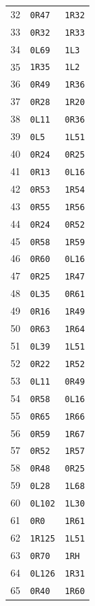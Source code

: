 \begin{center}
\begin{minipage}[t]{0.32\linewidth}
\begin{tabular}{rll}
32&\texttt{0R47}&\texttt{1R32}\\
33&\texttt{0R32}&\texttt{1R33}\\
34&\texttt{0L69}&\texttt{1L3}\\
35&\texttt{1R35}&\texttt{1L2}\\
36&\texttt{0R49}&\texttt{1R36}\\
37&\texttt{0R28}&\texttt{1R20}\\
38&\texttt{0L11}&\texttt{0R36}\\
39&\texttt{0L5}&\texttt{1L51}\\
40&\texttt{0R24}&\texttt{0R25}\\
41&\texttt{0R13}&\texttt{0L16}\\
42&\texttt{0R53}&\texttt{1R54}\\
43&\texttt{0R55}&\texttt{1R56}\\
44&\texttt{0R24}&\texttt{0R52}\\
45&\texttt{0R58}&\texttt{1R59}\\
46&\texttt{0R60}&\texttt{0L16}\\
47&\texttt{0R25}&\texttt{1R47}\\
48&\texttt{0L35}&\texttt{0R61}\\
49&\texttt{0R16}&\texttt{1R49}\\
50&\texttt{0R63}&\texttt{1R64}\\
51&\texttt{0L39}&\texttt{1L51}\\
52&\texttt{0R22}&\texttt{1R52}\\
53&\texttt{0L11}&\texttt{0R49}\\
54&\texttt{0R58}&\texttt{0L16}\\
55&\texttt{0R65}&\texttt{1R66}\\
56&\texttt{0R59}&\texttt{1R67}\\
57&\texttt{0R52}&\texttt{1R57}\\
58&\texttt{0R48}&\texttt{0R25}\\
59&\texttt{0L28}&\texttt{1L68}\\
60&\texttt{0L102}&\texttt{1L30}\\
61&\texttt{0R0}&\texttt{1R61}\\
62&\texttt{1R125}&\texttt{1L51}\\
63&\texttt{0R70}&\texttt{1RH}\\
64&\texttt{0L126}&\texttt{1R31}\\
65&\texttt{0R40}&\texttt{1R60}\\
\bottomrule\end{tabular}\end{minipage}
\hfill

\end{center}
